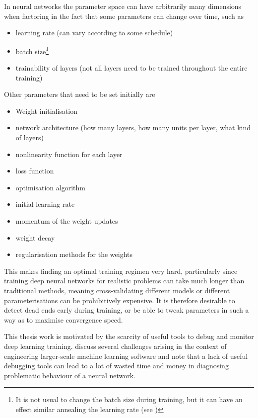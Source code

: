 In neural networks the parameter space can have arbitrarily many dimensions when
factoring in the fact that some parameters can change over time, such as

\begin{itemize}
    \item
        learning rate (can vary according to some schedule)
    \item
        batch size\footnote{It is not usual to change the batch size during
            training, but it can have an effect similar annealing the learning
        rate (see \cite{DBLP:journals/corr/abs-1711-00489})}
    \item
        trainability of layers (not all layers need to be trained throughout the
        entire training)
\end{itemize}

Other parameters that need to be set initially are

\begin{itemize}
    \item
        Weight initialisation
    \item
        network architecture (how many layers, how many units per layer,
        what kind of layers)
    \item
        nonlinearity function for each layer
    \item
        loss function
    \item
        optimisation algorithm
    \item
        initial learning rate
    \item
        momentum of the weight updates
    \item
        weight decay
    \item
        regularisation methods for the weights
\end{itemize}

This makes finding an optimal training regimen very hard, particularly since
training deep neural networks for realistic problems can take much longer than
traditional methods, meaning cross-validating different models or different
parameterisations can be prohibitively expensive. It is therefore desirable to
detect dead ends early during training, or be able to tweak parameters in such a
way as to maximise convergence speed.

This thesis work is motivated by the scarcity of useful tools to debug and
monitor deep learning training. \citet{arpteg2018software} discuss several
challenges arising in the context of engineering larger-scale machine learning
software and note that a lack of useful debugging tools can lead to a lot of
wasted time and money in diagnosing problematic behaviour of a neural network.

